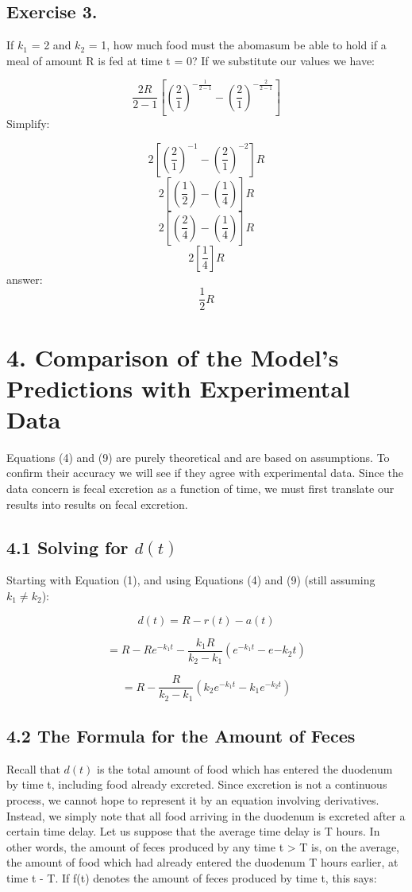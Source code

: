 \documentclass[]{article}
\begin{document}
\subsection{Exercise 3.}\label{exercise-3.}

If \(k_1\) = 2 and \(k_2\) = 1, how much food must the abomasum be able
to hold if a meal of amount R is fed at time t = 0? If we substitute our
values we have:

\[\frac{2 R}{2 - 1}[(\frac{2}{1})^{-\frac{1}{2-1}}-(\frac{2}{1})^{-\frac{2}{2-1}}]\]
Simplify:

\[2[(\frac{2}{1})^{-1}-(\frac{2}{1})^{-2}]R\]
\[2[(\frac{1}{2})-(\frac{1}{4})]R\] \[2[(\frac{2}{4})-(\frac{1}{4})]R\]
\[2[\frac{1}{4}]R\] answer: \[\frac{1}{2}R\]

\newpage

\section{4. Comparison of the Model's Predictions with Experimental
Data}\label{comparison-of-the-models-predictions-with-experimental-data}

Equations (4) and (9) are purely theoretical and are based on
assumptions. To confirm their accuracy we will see if they agree with
experimental data. Since the data concern is fecal excretion as a
function of time, we must first translate our results into results on
fecal excretion.

\subsection{\texorpdfstring{4.1 Solving for
\(d(t)\)}{4.1 Solving for d(t)}}\label{solving-for-dt}

Starting with Equation (1), and using Equations (4) and (9) (still
assuming \(k_1 \neq k_2\)):

\[d(t) = R - r(t) - a(t)\]

\[= R - Re^{-k_1t} - \frac{k_1R}{k_2 - k_1} (e^{-k_1t}-e{-k_2t})\]

\[= R - \frac{R}{k_2-k_1}(k_2e^{-k_1t} - k_1e^{-k_2t})\]

\subsection{4.2 The Formula for the Amount of
Feces}\label{the-formula-for-the-amount-of-feces}

Recall that \(d(t)\) is the total amount of food which has entered the
duodenum by time t, including food already excreted. Since excretion is
not a continuous process, we cannot hope to represent it by an equation
involving derivatives. Instead, we simply note that all food arriving in
the duodenum is excreted after a certain time delay. Let us suppose that
the average time delay is T hours. In other words, the amount of feces
produced by any time t \textgreater{} T is, on the average, the amount
of food which had already entered the duodenum T hours earlier, at time
t - T. If f(t) denotes the amount of feces produced by time t, this
says:
\end{document}
